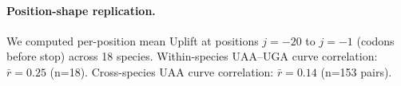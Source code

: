 
\paragraph{Position-shape replication.}
We computed per-position mean Uplift at positions $j=-20$ to $j=-1$ (codons before stop) across 18 species.
Within-species UAA--UGA curve correlation: $\bar{r} = 0.25$ (n=18).
Cross-species UAA curve correlation: $\bar{r} = 0.14$ (n=153 pairs).
